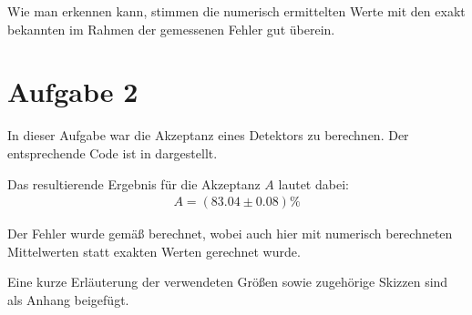 Wie man erkennen kann, stimmen die numerisch ermittelten Werte mit den exakt bekannten
im Rahmen der gemessenen Fehler gut überein.

\section*{Aufgabe 2}
In dieser Aufgabe war die Akzeptanz eines Detektors zu berechnen. Der entsprechende
Code ist in  dargestellt.



Das resultierende Ergebnis für die Akzeptanz $A$ lautet dabei:
\begin{eqnarray}
A = (83.04 \pm 0.08)\%
\end{eqnarray}

Der Fehler wurde gemäß  berechnet, wobei auch hier mit numerisch
berechneten Mittelwerten statt exakten Werten gerechnet wurde.

Eine kurze Erläuterung der verwendeten Größen sowie zugehörige Skizzen sind als
Anhang beigefügt.